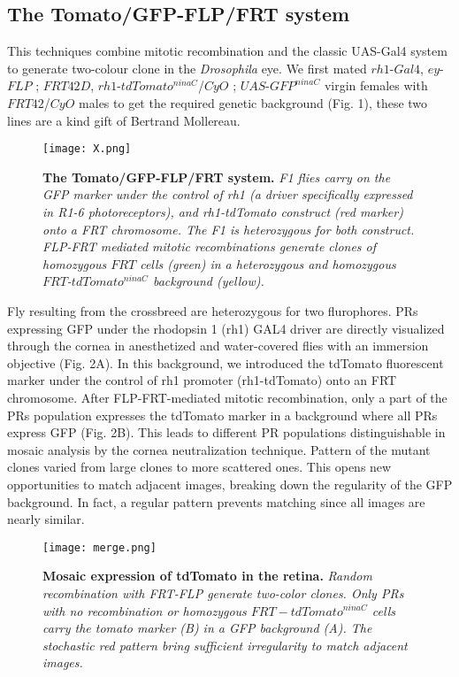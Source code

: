 \documentclass{article}
\begin{document}
\subsection{The Tomato/GFP-FLP/FRT system}
This techniques combine mitotic recombination and the classic UAS-Gal4 system to generate two-colour clone in the \textit{Drosophila} eye.
We first mated $rh1$-$Gal4$, $ey$-$FLP$ ; $FRT42D$, $rh1$-$tdTomato^{ninaC}$/$CyO$ ; $UAS$-$GFP^{ninaC}$ virgin females with $FRT42$/$CyO$ males to get the required genetic background (Fig. 1), these two lines are a kind gift of Bertrand Mollereau.
\begin{figure}[H]
	  \centering
  	\texttt{[image: X.png]}
  	\caption{\textbf{The Tomato/GFP-FLP/FRT system.} \textsl{F1 flies carry on the GFP marker under the control of rh1 (a driver specifically expressed in R1-6 photoreceptors), and rh1-tdTomato construct (red marker) onto a FRT chromosome. The F1 is heterozygous for both construct. FLP-FRT mediated mitotic recombinations generate clones of homozygous $FRT$ cells (green) in a heterozygous and homozygous $FRT$-$tdTomato^{ninaC}$ background (yellow).}
  	}
	\end{figure}

Fly resulting from the crossbreed are heterozygous for two flurophores. PRs expressing GFP under the rhodopsin 1 (rh1) GAL4 driver are directly visualized through the cornea in anesthetized and water-covered flies with an immersion objective (Fig. 2A). In this background, we introduced the tdTomato fluorescent marker \cite{ref3} under the control of rh1 promoter (rh1-tdTomato) onto an FRT chromosome. After FLP-FRT-mediated mitotic recombination, only a part of the PRs population expresses the tdTomato marker in a background where all PRs express GFP\cite{ref}\cite{ref1} (Fig. 2B). This leads to different PR populations distinguishable in mosaic analysis by
the cornea neutralization technique\cite{ref2}. Pattern of the mutant clones varied from large clones to more scattered ones. This opens new opportunities to match adjacent images, breaking down the regularity of the GFP background. In fact, a regular pattern prevents matching since all images are nearly similar.
\begin{figure}[H]
	  \centering
  	\texttt{[image: merge.png]}
  	\caption{\textbf{Mosaic expression of tdTomato in the retina.
} \textsl{Random recombination with FRT-FLP generate two-color clones. Only PRs with no recombination or homozygous $FRT-tdTomato^{ninaC}$ cells carry the tomato marker (B) in a GFP background (A). The stochastic red pattern bring sufficient irregularity to match adjacent images.}}
	\end{figure}
\end{document}
